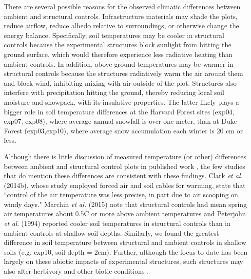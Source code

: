 \documentclass{article}
\begin{document}
\par There are several possible reasons for the observed climatic differences between ambient and structural controls. Infrastructure materials may shade the plots, reduce airflow, reduce albedo relative to surroundings, or otherwise change the energy balance. Specifically, soil temperatures may be cooler in structural controls because the experimental structures block sunlight from hitting the ground surface, which would therefore experience less radiative heating than ambient controls. In addition, above-ground temperatures may be warmer in structural controls because the structures radiatively warm the air around them and block wind, inhibiting mixing with air outside of the plot. Structures also interfere with precipitation hitting the ground, thereby reducing local soil moisture and snowpack, with its insulative properties. The latter likely plays a bigger role in soil temperature differences at the Harvard Forest sites (exp04, exp07, exp08), where average annual snowfall is over one meter, than at Duke Forest (exp03,exp10), where average snow accumulation each winter is 20 cm or less. %

\par Although there is little discussion of measured temperature (or other) differences between ambient and structural control plots in published work \citep[e.g.,][]{farnsworth1995,pelini2011,clark2014a}, the few studies that do mention these differences are consistent with these findings. Clark \textit{et al.} (2014b), whose study employed forced air and soil cables for warming, state that ``control of the air temperature was less precise, in part due to air scooping on windy days." Marchin \textit{et al.} (2015) note that structural controls had mean spring air temperatures about  0.5\degree C or more above ambient temperatures and Peterjohn \textit{et al.} (1994) reported cooler soil temperatures in structural controls than in ambient controls at shallow soil depths. Similarly, we found the greatest difference in soil temperature between structural and ambient controls in shallow soils (e.g. exp10, soil depth = 2cm). Further, although the focus to date has been largely on these abiotic impacts of experimental structures, such structures may also alter herbivory and other biotic conditions \citep{kennedy1995,moise2010,wolkovich2012,hoeppner2012}. 
\end{document}
